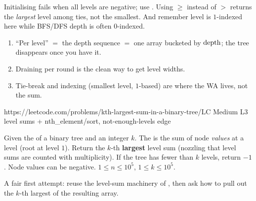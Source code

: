 
\begin{warningbox}
Initialising  fails when all levels are negative; use . Using
$\ge$ instead of $>$ returns the \emph{largest} level among ties, not the smallest. And
remember level is $1$-indexed here while BFS/DFS depth is often $0$-indexed.
\end{warningbox}

\begin{insightbox}
\begin{enumerate}[nosep, leftmargin=1.6em]
  \item ``Per level'' $=$ the depth sequence $=$ one array bucketed by $\operatorname{depth}$; the tree
        disappears once you have it.
  \item Draining  per round is the clean way to get level widths.
  \item Tie-break and indexing (smallest level, $1$-based) are where the WA lives, not the sum.
\end{enumerate}
\end{insightbox}

  {https://leetcode.com/problems/kth-largest-sum-in-a-binary-tree/}{LC Medium L3}
  {level sums + nth\_element/sort, not-enough-levels edge}

\begin{problemstatement}
Given the  of a binary tree and an integer $k$. The  is the sum of
node \emph{values} at a level (root at level $1$). Return the $k$-th \textbf{largest} level sum
(nozzling that level sums are counted with multiplicity). If the tree has fewer than $k$
levels, return $-1$. Node values can be negative. $1 \le n \le 10^5$, $1 \le k \le 10^5$.
\end{problemstatement}

\begin{attemptgate}
A fair first attempt: reuse the level-sum machinery of , then ask how to
pull out the $k$-th largest of the resulting array.
\end{attemptgate}

